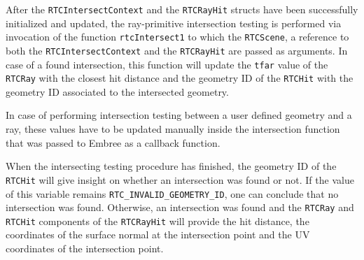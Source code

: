 After the \texttt{RTCIntersectContext} and the \texttt{RTCRayHit} structs have been successfully initialized and updated, the ray-primitive intersection testing is performed via invocation of the function \texttt{rtcIntersect1} to which the \texttt{RTCScene}, a reference to both the \texttt{RTCIntersectContext} and the \texttt{RTCRayHit} are passed as arguments. In case of a found intersection, this function will update the \texttt{tfar} value of the \texttt{RTCRay} with the closest hit distance and the geometry ID of the \texttt{RTCHit} with the geometry ID associated to the intersected geometry.

In case of performing intersection testing between a user defined geometry and a ray, these values have to be updated manually inside the intersection function that was passed to Embree as a callback function.

When the intersecting testing procedure has finished, the geometry ID of the \texttt{RTCHit} will give insight on whether an intersection was found or not. If the value of this variable remains \texttt{RTC\_INVALID\_GEOMETRY\_ID}, one can conclude that no intersection was found. Otherwise, an intersection was found and the \texttt{RTCRay} and \texttt{RTCHit} components of the \texttt{RTCRayHit} will provide the hit distance, the coordinates of the surface normal at the intersection point and the UV coordinates of the intersection point.

